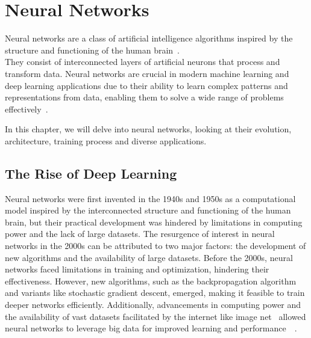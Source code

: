 % 
 
\section{Neural Networks}


Neural networks are a class of artificial intelligence algorithms inspired by the structure and functioning of the human brain~\cite{DeepLearningTextBook}. \\
They consist of interconnected layers of artificial neurons that process and transform data. Neural networks are crucial in modern machine learning and deep learning applications due to their ability to learn complex patterns and representations from data, enabling them to solve a wide range of problems effectively~\cite{DeepLearningTextBook}.

In this chapter, we will delve into neural networks, looking at their evolution, architecture, training process and diverse applications.
% 

\subsection{The Rise of Deep Learning}

Neural networks were first invented in the 1940s and 1950s as a computational model inspired by the interconnected structure and functioning of the human brain, but their practical development was hindered by limitations in computing power and the lack of large datasets. 
The resurgence of interest in neural networks in the 2000s can be attributed to two major factors: the development of new algorithms and the availability of large datasets. Before the 2000s, neural networks faced limitations in training and optimization, hindering their effectiveness. However, new algorithms, such as the backpropagation algorithm and variants like stochastic gradient descent, emerged, making it feasible to train deeper networks efficiently. Additionally, advancements in computing power and the availability of vast datasets facilitated by the internet like image net~\cite{ImageNet} allowed neural networks to leverage big data for improved learning and performance~\cite{VGG16}~\cite{ResNet50}.

